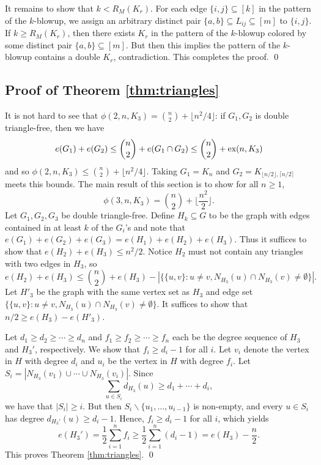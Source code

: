 \documentclass[12pt]{article}
\newcommand*{\ex}{\textnormal{ex}}
\begin{document}
It remains to show that $k < R_M(K_r)$. For each edge $\{i, j\} \subseteq [k]$ in the pattern of the $k$-blowup, we assign an arbitrary distinct pair $\{a, b\} \subseteq L_{ij} \subseteq [m]$ to $\{i, j\}$. If $k \geq R_M(K_r)$, then there exists $K_r$ in the pattern of the $k$-blowup colored by some distinct pair $\{a, b\} \subseteq [m]$. But then this implies the pattern of the $k$-blowup contains a double $K_r$, contradiction. This completes the proof. \qed

\subsection{Proof of Theorem \ref{thm:triangles}}

It is not hard to see that $\phi(2,n,K_3) = \binom{n}{2} + \lfloor n^2/4\rfloor$: if $G_1,G_2$ 
is double triangle-free, then we have
\[
	e(G_1) + e(G_2) \leq \binom{n}{2} + e(G_1 \cap G_2) \leq \binom{n}{2} + \ex(n, K_3)
\]
and so $\phi(2,n,K_3) \leq \binom{n}{2} + \lfloor n^2/4\rfloor$. Taking $G_1 = K_n$ and $G_2 = K_{\lfloor n/2 \rfloor,\lceil n/2 \rceil}$ meets this bounds. The main result of this section is to show for all $n \geq 1$, 
\[    
  \phi(3, n, K_3) = \binom{n}{2} + \Big\lfloor \frac{n^2}{2} \Big\rfloor.
\]
Let $G_1,G_2,G_3$ be double triangle-free. Define $H_k \subseteq G$ to be the graph with edges contained in at least $k$  of the $G_i$'s and note that $e(G_1) + e(G_2) + e(G_3) = e(H_1) + e(H_2) + e(H_3)$. Thus it suffices to show that $e(H_2) + e(H_3) \leq n^2/2$. Notice $H_2$ must not contain any triangles with two edges in $H_3$, so
\[
  e(H_2) + e(H_3) \leq \binom{n}{2} + e(H_3) - |\{\{u, v\} : u \neq v, N_{H_3}(u) \cap N_{H_3}(v) \neq \emptyset\}|.
\]
Let $H'_3$ be the graph with the same vertex set as $H_3$ and edge set $\{\{u, v\} : u \neq v, N_{H_3}(u) \cap N_{H_3}(v) \neq \emptyset\}$. It suffices to show that $n/2 \geq e(H_3) - e(H'_3)$. 

Let $d_1 \geq d_2 \geq \cdots \geq d_n$ and $f_1 \geq f_2 \geq \cdots \geq f_n$ each be the degree sequence of $H_3$ and $H_3'$, respectively. We show that $f_i \geq d_i - 1$ for all $i$. Let $v_i$ denote the vertex in $H$ with degree $d_i$ and $u_i$ be the vertex in $H$ with degree $f_i$. Let $S_i = |N_{H_3}(v_1) \cup \cdots \cup N_{H_3}(v_i)|$. Since 
\[
  \sum_{u \in S_i} d_{H_3}(u) \geq d_1 + \cdots + d_i,
\]
we have that $|S_i| \geq i$. But then $S_i \backslash \{u_1, \ldots, u_{i - 1}\}$ is non-empty, and every $u \in S_i$ has degree $d_{H_3'}(u) \geq d_i - 1$. Hence, $f_i \geq d_i - 1$ for all $i$, which yields
\[
  e(H_3') = \frac{1}{2}\sum_{i = 1}^n f_i \geq \frac{1}{2}\sum_{i = 1}^n (d_i - 1) = e(H_3) - \frac{n}{2}.
\]
This proves Theorem \ref{thm:triangles}. \qed
\end{document}

